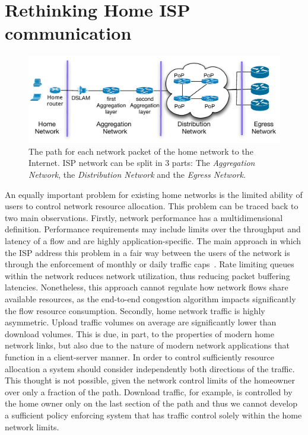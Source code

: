 \section{Rethinking Home ISP communication} \label{s:qos}

\begin{figure}
  \centering
  \includegraphics[width=0.95\columnwidth]{isp_plan}
  \caption{\label{fig:isp_plan} The path for each network packet of 
    the home network to the Internet. ISP network can be split in 3 parts:
  The {\it Aggregation Network}, the {\it Distribution Network} and the {\it
    Egress Network}.}
\end{figure}

An equally important problem for existing home networks is the limited ability
of users to control network resource allocation. This problem can be traced back
to two main observations. Firstly, network performance has a multidimensional
definition. Performance requirements may include limits over the  throughput and
latency of a flow and are highly application-specific.  The main approach in
which the ISP address this problem in a fair way between the users of the
network is through the enforcement of monthly or daily traffic
caps~\cite{virgin-caps,bt-caps}.  Rate limiting queues within the network
reduces network utilization, thus reducing packet buffering latencies.
Nonetheless, this approach cannot regulate how network flows share available
resources, as the end-to-end congestion algorithm impacts significantly the flow
resource consumption. Secondly, home network traffic is highly asymmetric.
Upload traffic volumes on average are significantly lower than download volumes.
This is due, in part, to the properties of modern home network links, but also
due to the nature of modern network applications that function in a
client-server manner.  In order to control sufficiently resource allocation a
system should consider independently both directions of the traffic. This
thought is not possible, given the network control limits of the homeowner over
only a fraction of the path. Download traffic, for example, is controlled by the
home owner only on the last section of the path and thus we cannot develop a
sufficient policy enforcing system that has traffic control solely within the
home network limits.

